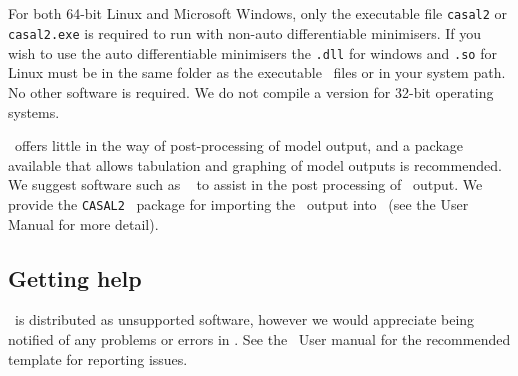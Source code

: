 \subsection{}

For both 64-bit Linux and Microsoft Windows, only the executable file \texttt{casal2} or \texttt{casal2.exe} is required to run \CNAME with non-auto differentiable minimisers. If you wish to use the auto differentiable minimisers the \texttt{.dll} for windows and \texttt{.so} for Linux must be in the same folder as the executable \CNAME\ files or in your system path. No other software is required. We do not compile a version for 32-bit operating systems. 

\CNAME\ offers little in the way of post-processing of model output, and a package available that allows tabulation and graphing of model outputs is recommended. We suggest software such as \href{http://www.r-project.org}{\R}\ \citep{R} to assist in the post processing of \CNAME\ output. We provide the \texttt{CASAL2} \R\ package for importing the \CNAME\ output into \R\ (see the \CNAME User Manual for more detail).

\subsection{Getting help}

\CNAME\ is distributed as unsupported software, however we would appreciate being notified of any problems or errors in \CNAME. See the \CNAME\ User manual \citep{CASAL2} for the recommended template for reporting issues.

